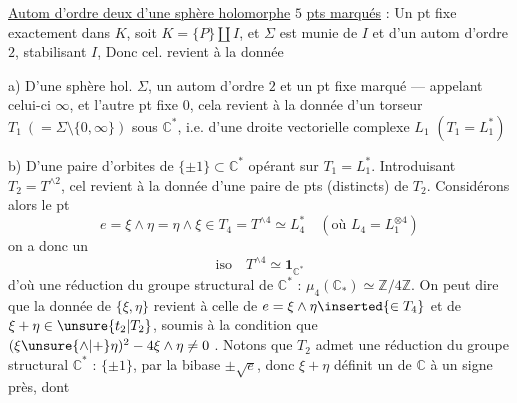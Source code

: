 \uline{Autom d'ordre deux d'une sphère holomorphe} \inserted{$\Sigma$}
\uline{}  $5$ \uline{pts marqués} : Un pt fixe exactement dans $K$,
soit $K=\{P\}\amalg I$, et $\Sigma$ est munie de $I$ et d'un autom
\inserted{$\sigma$} d'ordre $2$, stabilisant $I$,
Donc cel. revient à la donnée

a) D'une sphère hol. $\Sigma$, un autom \inserted{$\sigma$} d'ordre $2$
et un pt fixe marqué --- appelant celui-ci $\infty$, et l'autre pt fixe $0$,
cela revient à la donnée d'un torseur $T_1\ (= \Sigma\setminus\{0,\infty\})$
sous $\mathbb C^*$, i.e. d'une droite vectorielle complexe $L_1$
$(T_1=L_1^*)$

b) D'une paire d'orbites  de
$\{\pm1\}\subset\mathbb C^*$ opérant sur $T_1=L_1^*$.
Introduisant $T_2=T^{\wedge2}$, cel revient à la donnée d'une paire de pts
\inserted{$\{\xi,\eta\}$} (distincts) de $T_2$.
Considérons alors le pt
\[
 e=\xi\wedge\eta=\eta\wedge\xi
 \in T_4=T^{\wedge4}\simeq L_4^*
 \quad(\text{où }L_4=L_1^{\otimes4})
\]
on a donc un
\[
 \mathrm{iso}\quad T^{\wedge4}\simeq\mathbf1_{\mathbb C^*}
\]
d'où une réduction du groupe structural 
de $\mathbb C^*$ : $\mu_4(\mathbb C_*)\simeq\mathbb Z/4\mathbb Z$.
On peut dire que la donnée de $\{\xi,\eta\}$ revient à celle de
$e=\xi\wedge\eta\inserted{\in T_4}$ et de
$\xi+\eta\in\unsure{t_2|T_2}$, soumis à la condition que
$(\xi\unsure{\wedge|+}\eta)^2-4\xi\wedge\eta\ne0$ .
Notons 
que $T_2$ admet une réduction du groupe structural $\mathbb C^*$ :
$\{\pm1\}$, par la bibase $\pm\sqrt e$, donc $\xi+\eta$
définit un  de $\mathbb C$ à un signe près, dont
